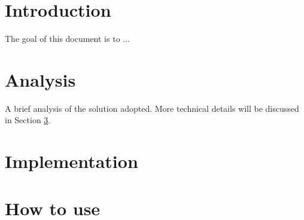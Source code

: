 \documentclass[12pt,a4paper]{article}
\begin{document}

\newcommand{\mytitle}{Title}
\newcommand{\mysubtitle}{Subtitle}
\newcommand{\myauthor}{FirstName LastName Number}
\newcommand{\mydate}{MMM YYYY}
\newcommand{\mycourse}{Course name}
\newcommand{\mycourseyears}{YYYY/YYYY}
\newcommand{\myversion}{1.0}





\section{Introduction} \label{intro}
    The goal of this document is to ...
    
\section{Analysis} \label{analysis}
    A brief analysis of the solution adopted. More technical details will be discussed in Section \ref{impl}.
        
\section{Implementation} \label{impl}

\section{How to use} \label{usage}
\end{document}
